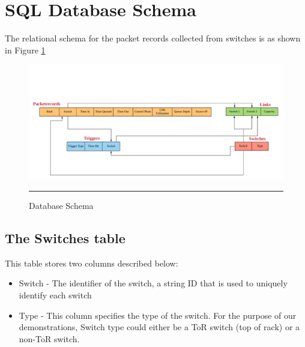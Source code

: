 

\section{SQL Database Schema}

The relational schema for the packet records collected from switches is as shown in Figure \ref{fig:Schema}
\begin{figure}[htbp]
	\centering
		\includegraphics[width=1.0\columnwidth]{Figures/Schema.png}
		\rule{35em}{0.5pt}
	\caption[RDBMS Schema]{Database Schema}
	\label{fig:Schema}
\end{figure}

\subsection{The Switches table}

This table stores two columns described below:
\begin{itemize}
	\item Switch - The identifier of the switch, a string ID that is used to uniquely
	identify each switch
	\item Type - This column specifies the type of the switch. For the purpose of our 
	demonstrations, Switch type could either be a ToR switch (top of rack) or a non-ToR switch.
\end{itemize}

